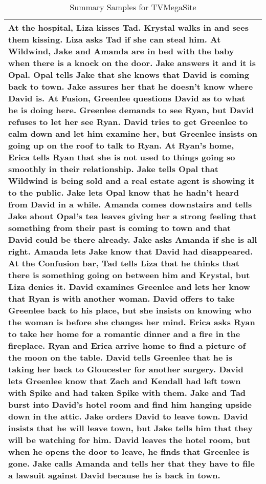 \begin{table}[!htbp]
\begin{tabular}{p{\linewidth}}
At the hospital, Liza kisses Tad. Krystal walks in and sees them kissing. Liza asks Tad if she can steal him. At Wildwind, Jake and Amanda are in bed with the baby when there is a knock on the door. Jake answers it and it is Opal. Opal tells Jake that she knows that David is coming back to town. Jake assures her that he doesn't know where David is. At Fusion, Greenlee questions David as to what he is doing here. Greenlee demands to see Ryan, but David refuses to let her see Ryan. David tries to get Greenlee to calm down and let him examine her, but Greenlee insists on going up on the roof to talk to Ryan. At Ryan's home, Erica tells Ryan that she is not used to things going so smoothly in their relationship. Jake tells Opal that Wildwind is being sold and a real estate agent is showing it to the public. Jake lets Opal know that he hadn't heard from David in a while. Amanda comes downstairs and tells Jake about Opal's tea leaves giving her a strong feeling that something from their past is coming to town and that David could be there already. Jake asks Amanda if she is all right. Amanda lets Jake know that David had disappeared. At the Confusion bar, Tad tells Liza that he thinks that there is something going on between him and Krystal, but Liza denies it. David examines Greenlee and lets her know that Ryan is with another woman. David offers to take Greenlee back to his place, but she insists on knowing who the woman is before she changes her mind. Erica asks Ryan to take her home for a romantic dinner and a fire in the fireplace. Ryan and Erica arrive home to find a picture of the moon on the table. David tells Greenlee that he is taking her back to Gloucester for another surgery. David lets Greenlee know that Zach and Kendall had left town with Spike and had taken Spike with them. Jake and Tad burst into David's hotel room and find him hanging upside down in the attic. Jake orders David to leave town. David insists that he will leave town, but Jake tells him that they will be watching for him. David leaves the hotel room, but when he opens the door to leave, he finds that Greenlee is gone. Jake calls Amanda and tells her that they have to file a lawsuit against David because he is back in town.
    \\
    \bottomrule
    \end{tabular}
    \caption{
    Summary Samples for TVMegaSite
    }
\end{table}

